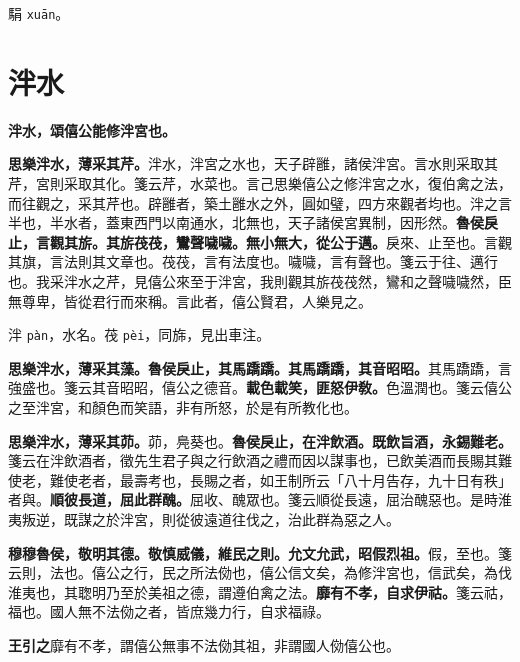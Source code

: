\begin{quoting}駽 \texttt{xuān}。\end{quoting}

\section{泮水}


\textbf{泮水，頌僖公能修泮宮也。}

\textbf{思樂泮水，薄采其芹。}{\footnotesize 泮水，泮宮之水也，天子辟雝，諸侯泮宮。言水則采取其芹，宮則采取其化。箋云芹，水菜也。言己思樂僖公之修泮宮之水，復伯禽之法，而往觀之，采其芹也。辟雝者，築土雝水之外，圓如璧，四方來觀者均也。泮之言半也，半水者，蓋東西門以南通水，北無也，天子諸侯宮異制，因形然。}\textbf{魯侯戾止，言觀其旂。其旂茷茷，鸞聲噦噦。無小無大，從公于邁。}{\footnotesize 戾來、止至也。言觀其旗，言法則其文章也。茷茷，言有法度也。噦噦，言有聲也。箋云于往、邁行也。我采泮水之芹，見僖公來至于泮宮，我則觀其旂茷茷然，鸞和之聲噦噦然，臣無尊卑，皆從君行而來稱。言此者，僖公賢君，人樂見之。}

\begin{quoting}泮 \texttt{pàn}，水名。茷 \texttt{pèi}，同旆，見出車注。\end{quoting}

\textbf{思樂泮水，薄采其藻。魯侯戾止，其馬蹻蹻。其馬蹻蹻，其音昭昭。}{\footnotesize 其馬蹻蹻，言強盛也。箋云其音昭昭，僖公之德音。}\textbf{載色載笑，匪怒伊敎。}{\footnotesize 色溫潤也。箋云僖公之至泮宮，和顏色而笑語，非有所怒，於是有所教化也。}

\textbf{思樂泮水，薄采其茆。}{\footnotesize 茆，鳧葵也。}\textbf{魯侯戾止，在泮飲酒。既飲旨酒，永錫難老。}{\footnotesize 箋云在泮飲酒者，徵先生君子與之行飲酒之禮而因以謀事也，已飲美酒而長賜其難使老，難使老者，最壽考也，長賜之者，如王制所云「八十月告存，九十日有秩」者與。}\textbf{順彼長道，屈此群醜。}{\footnotesize 屈收、醜眾也。箋云順從長遠，屈治醜惡也。是時淮夷叛逆，既謀之於泮宮，則從彼遠道往伐之，治此群為惡之人。}

\textbf{穆穆魯侯，敬明其德。敬慎威儀，維民之則。允文允武，昭假烈祖。}{\footnotesize 假，至也。箋云則，法也。僖公之行，民之所法俲也，僖公信文矣，為修泮宮也，信武矣，為伐淮夷也，其聦明乃至於美祖之德，謂遵伯禽之法。}\textbf{靡有不孝，自求伊祜。}{\footnotesize 箋云祜，福也。國人無不法俲之者，皆庶幾力行，自求福祿。}

\begin{quoting}\textbf{王引之}靡有不孝，謂僖公無事不法俲其祖，非謂國人俲僖公也。\end{quoting}

